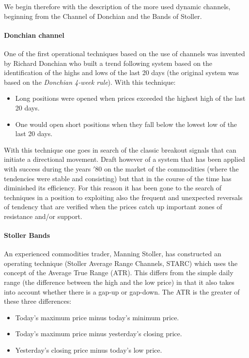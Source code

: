 We begin therefore with the description of the more used dynamic channels, beginning from the Channel of Donchian and the Bands of Stoller. 

\paragraph{\textbf{Donchian channel}}\mbox{}

One of the first operational techniques based on the use of channels was invented by Richard Donchian who built a trend following system based on the identification of the highs and lows of the last 20 days (the original system was based on the \textit{Donchian 4-week rule}). With this technique:

\begin{itemize}
\setlength\itemsep{0.3em}
\item Long positions were opened when prices exceeded the highest high of the last 20 days.
\item One would open short positions when they fall below the lowest low of the last 20 days.
\end{itemize}  

With this technique one goes in search of the classic breakout signals that can initiate a directional movement. Draft however of a system that has been applied with success during the years $'80$ on the market of the commodities (where the tendencies were stable and consisting) but that in the course of the time has diminished its efficiency. For this reason it has been gone to the search of techniques in a position to exploiting also the frequent and unexpected reversals of tendency that are verified when the prices catch up important zones of resistance and/or support.

\paragraph{\textbf{Stoller Bands}}\mbox{}

An experienced commodities trader, Manning Stoller, has constructed an operating technique (Stoller Average Range Channels, STARC) which uses the concept of the Average True Range (ATR). This differs from the simple daily range (the difference between the high and the low price) in that it also takes into account whether there is a gap-up or gap-down.
The ATR is the greater of these three differences:

\begin{itemize}
\setlength\itemsep{0.3em}
\item Today's maximum price minus today's minimum price.
\item Today's maximum price minus yesterday's closing price.
\item Yesterday's closing price minus today's low price.
\end{itemize}  


